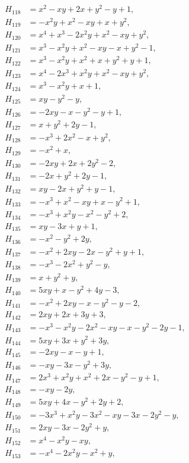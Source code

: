 \documentclass[11pt]{article}
\begin{document}
\begin{align*}
H_{118}&=x^{2}-xy+2x+y^{2}-y+1,\\
H_{119}&=-x^{2}y+x^{2}-xy+x+y^{2},\\
H_{120}&=x^{4}+x^{3}-2x^{2}y+x^{2}-xy+y^{2},\\
H_{121}&=x^{3}-x^{2}y+x^{2}-xy-x+y^{2}-1,\\
H_{122}&=x^{3}-x^{2}y+x^{2}+x+y^{2}+y+1,\\
H_{123}&=x^{4}-2x^{3}+x^{2}y+x^{2}-xy+y^{2},\\
H_{124}&=x^{3}-x^{2}y+x+1,\\
H_{125}&=xy-y^{2}-y,\\
H_{126}&=-2xy-x-y^{2}-y+1,\\
H_{127}&=x+y^{2}+2y-1,\\
H_{128}&=-x^{3}+2x^{2}-x+y^{2},\\
H_{129}&=-x^{2}+x,\\
H_{130}&=-2xy+2x+2y^{2}-2,\\
H_{131}&=-2x+y^{2}+2y-1,\\
H_{132}&=xy-2x+y^{2}+y-1,\\
H_{133}&=-x^{3}+x^{2}-xy+x-y^{2}+1,\\
H_{134}&=-x^{3}+x^{2}y-x^{2}-y^{2}+2,\\
H_{135}&=xy-3x+y+1,\\
H_{136}&=-x^{2}-y^{2}+2y,\\
H_{137}&=-x^{2}+2xy-2x-y^{2}+y+1,\\
H_{138}&=-x^{3}-2x^{2}+y^{2}-y,\\
H_{139}&=x+y^{2}+y,\\
H_{140}&=5xy+x-y^{2}+4y-3,\\
H_{141}&=-x^{2}+2xy-x-y^{2}-y-2,\\
H_{142}&=2xy+2x+3y+3,\\
H_{143}&=-x^{3}-x^{2}y-2x^{2}-xy-x-y^{2}-2y-1,\\
H_{144}&=5xy+3x+y^{2}+3y,\\
H_{145}&=-2xy-x-y+1,\\
H_{146}&=-xy-3x-y^{2}+3y,\\
H_{147}&=2x^{3}+x^{2}y+x^{2}+2x-y^{2}-y+1,\\
H_{148}&=-xy-2y,\\
H_{149}&=5xy+4x-y^{2}+2y+2,\\
H_{150}&=-3x^{3}+x^{2}y-3x^{2}-xy-3x-2y^{2}-y,\\
H_{151}&=2xy-3x-2y^{2}+y,\\
H_{152}&=x^{4}-x^{2}y-xy,\\
H_{153}&=-x^{4}-2x^{2}y-x^{2}+y,\\

\end{align*}
\end{document}
